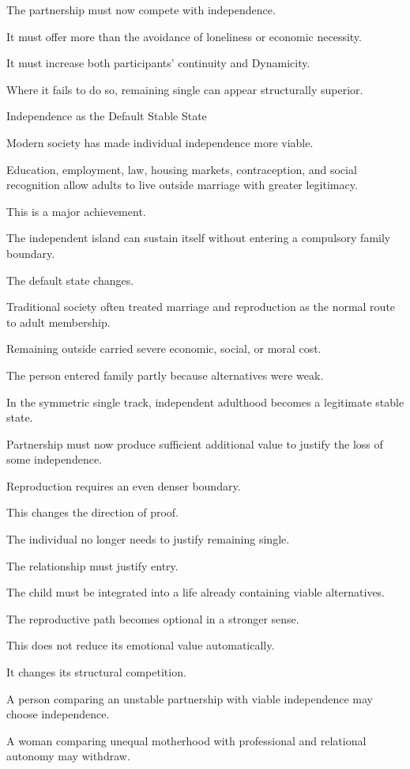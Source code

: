 The partnership must now compete with independence.

It must offer more than the avoidance of loneliness or economic necessity.

It must increase both participants’ continuity and Dynamicity.

Where it fails to do so, remaining single can appear structurally superior.

Independence as the Default Stable State

Modern society has made individual independence more viable.

Education, employment, law, housing markets, contraception, and social recognition allow adults to live outside marriage with greater legitimacy.

This is a major achievement.

The independent island can sustain itself without entering a compulsory family boundary.

The default state changes.

Traditional society often treated marriage and reproduction as the normal route to adult membership.

Remaining outside carried severe economic, social, or moral cost.

The person entered family partly because alternatives were weak.

In the symmetric single track, independent adulthood becomes a legitimate stable state.

Partnership must now produce sufficient additional value to justify the loss of some independence.

Reproduction requires an even denser boundary.

This changes the direction of proof.

The individual no longer needs to justify remaining single.

The relationship must justify entry.

The child must be integrated into a life already containing viable alternatives.

The reproductive path becomes optional in a stronger sense.

This does not reduce its emotional value automatically.

It changes its structural competition.

A person comparing an unstable partnership with viable independence may choose independence.

A woman comparing unequal motherhood with professional and relational autonomy may withdraw.

